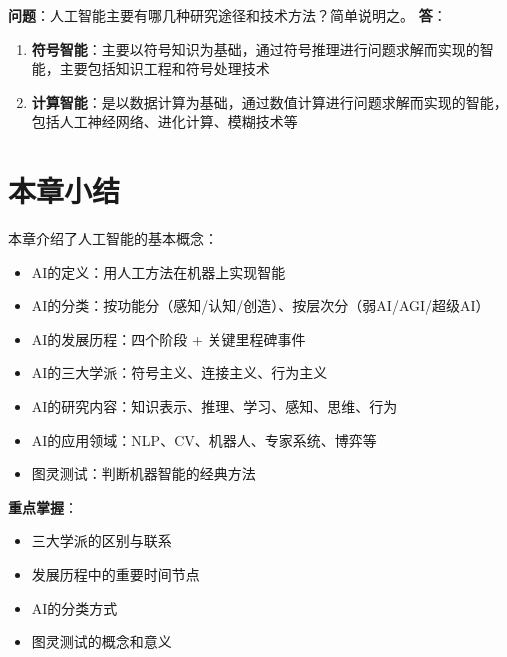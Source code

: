 \begin{examplebox}[简答题1.2]
\textbf{问题}：人工智能主要有哪几种研究途径和技术方法？简单说明之。
\tcblower
\textbf{答}：
\begin{enumerate}[itemsep=0pt]
    \item \textbf{符号智能}：主要以符号知识为基础，通过符号推理进行问题求解而实现的智能，主要包括知识工程和符号处理技术
    \item \textbf{计算智能}：是以数据计算为基础，通过数值计算进行问题求解而实现的智能，包括人工神经网络、进化计算、模糊技术等
\end{enumerate}
\end{examplebox}

\section{本章小结}

本章介绍了人工智能的基本概念：
\begin{itemize}[leftmargin=2em,itemsep=0pt]
    \item AI的定义：用人工方法在机器上实现智能
    \item AI的分类：按功能分（感知/认知/创造）、按层次分（弱AI/AGI/超级AI）
    \item AI的发展历程：四个阶段 + 关键里程碑事件
    \item AI的三大学派：符号主义、连接主义、行为主义
    \item AI的研究内容：知识表示、推理、学习、感知、思维、行为
    \item AI的应用领域：NLP、CV、机器人、专家系统、博弈等
    \item 图灵测试：判断机器智能的经典方法
\end{itemize}

\textbf{重点掌握}：
\begin{itemize}[leftmargin=2em,itemsep=0pt]
    \item 三大学派的区别与联系
    \item 发展历程中的重要时间节点
    \item AI的分类方式
    \item 图灵测试的概念和意义
\end{itemize}
